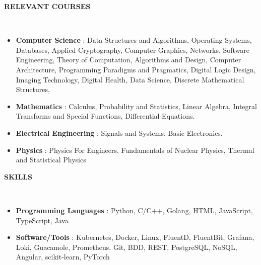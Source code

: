 \documentclass[a4paper,10pt]{article}
\newcommand{\lsep}{-0.6cm}
\newcommand{\resheading}[1]{{\small \colorbox{mygrey}{\begin{minipage}{0.975\textwidth}{\textbf{#1 \vphantom{p\^{E}}}}\end{minipage}}}}
\begin{document}
\resheading{\textbf{RELEVANT COURSES} }\\[\lsep]
\vspace{2.0pt}
\begin{itemize}[itemsep=0.1pt]
\item \noindent \textbf{Computer Science} : Data Structures and Algorithms, Operating Systems, Databases, Applied Cryptography, Computer Graphics, Networks, Software Engineering, Theory of Computation,  Algorithms and Design, Computer Architecture,
Programming Paradigms and Pragmatics, Digital Logic Design,
Imaging Technology, Digital Health, Data Science, Discrete Mathematical Structures, 
\item \noindent \textbf{Mathematics} : Calculus, Probability and Statistics, Linear Algebra, Integral Transforms
and Special Functions, Differential Equations.
\item \noindent \textbf{Electrical Engineering} : Signals and Systems, Basic Electronics.
\item \noindent \textbf{Physics} : Physics For Engineers, Fundamentals of Nuclear Physics, Thermal and Statistical Physics
\end{itemize}

\resheading{\textbf{SKILLS} }\\[\lsep]
\vspace{2.0pt}
\begin{itemize}[itemsep=0.1pt]

\item \noindent \textbf{Programming Languages} : Python, C/C++, Golang, HTML, JavaScript, TypeScript, Java
\item \noindent \textbf{Software/Tools} : Kubernetes, Docker, Linux, FluentD, FluentBit, Grafana, Loki, Guacamole, Prometheus, Git, BDD, REST, PostgreSQL, NoSQL, Angular, scikit-learn, PyTorch
\end{itemize}
\end{document}
